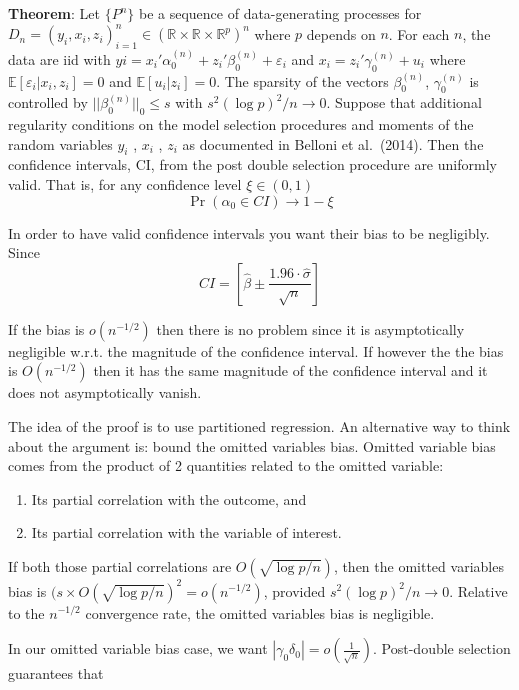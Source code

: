 \documentclass[12pt,]{book}
\providecommand{\tightlist}{%
  \setlength{\itemsep}{0pt}\setlength{\parskip}{0pt}}
\begin{document}
\textbf{Theorem}:
Let \(\{P^n\}\) be a sequence of data-generating processes for \(D_n = (y_i, x_i, z_i)^n_{i=1} \in (\mathbb R \times \mathbb R \times \mathbb R^p) ^n\) where \(p\) depends on \(n\). For each \(n\), the data are iid with \(yi = x_i'\alpha_0^{(n)} + z_i' \beta_0^{(n)} + \varepsilon_i\) and \(x_i = z_i' \gamma_0^{(n)} + u_i\) where \(\mathbb E[\varepsilon_i | x_i,z_i] = 0\) and \(\mathbb E[u_i|z_i] = 0\). The sparsity of the vectors \(\beta_0^{(n)}\), \(\gamma_0^{(n)}\) is controlled by \(|| \beta_0^{(n)} ||_0 \leq s\) with \(s^2 (\log p)^2/n \to 0\). Suppose that additional regularity conditions on the model selection procedures and moments of the random variables \(y_i\) , \(x_i\) , \(z_i\) as documented in Belloni et al.~(2014). Then the confidence intervals, CI, from the post double selection procedure are uniformly valid. That is, for any confidence level \(\xi \in (0, 1)\)
\[
        \Pr(\alpha_0 \in CI) \to 1- \xi
\]

In order to have valid confidence intervals you want their bias to be negligibly. Since
\[
  CI = \left[ \hat{\beta} \pm \frac{1.96 \cdot \hat{\sigma}}{\sqrt{n}} \right]
\]

If the bias is \(o(n^{-1/2})\) then there is no problem since it is asymptotically negligible w.r.t. the magnitude of the confidence interval. If however the the bias is \(O(n^{-1/2})\) then it has the same magnitude of the confidence interval and it does not asymptotically vanish.

The idea of the proof is to use partitioned regression. An alternative way to think about the argument is: bound the omitted variables bias. Omitted variable bias comes from the product of 2 quantities related to the omitted variable:

\begin{enumerate}
\def\labelenumi{\arabic{enumi}.}
\tightlist
\item
  Its partial correlation with the outcome, and
\item
  Its partial correlation with the variable of interest.
\end{enumerate}

If both those partial correlations are \(O( \sqrt{\log p/n})\), then the omitted variables bias is \((s \times O( \sqrt{\log p/n})^2 = o(n^{-1/2})\), provided \(s^2 (\log p)^2/n \to 0\). Relative to the \(n^{-1/2}\) convergence rate, the omitted variables bias is negligible.

In our omitted variable bias case, we want \(| \gamma_0 \delta_0 | = o \left(\frac{1}{\sqrt{n}}\right)\). Post-double selection guarantees that
\end{document}

